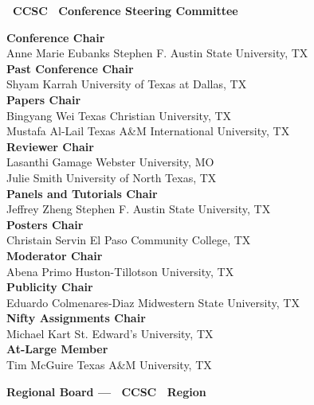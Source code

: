 \documentclass{article}
\begin{document}
\begingroup
  \centering
  \textbf{\large \confYear\ CCSC \confName\ Conference Steering Committee}\\
\endgroup

\vspace{10pt}

{\parindent0pt
\textbf{Conference Chair}\\
Anne Marie Eubanks \dotfill  Stephen F. Austin State University, TX\\
\textbf{Past Conference Chair}\\
Shyam Karrah \dotfill  University of Texas at Dallas, TX\\
\textbf{Papers Chair}\\
Bingyang Wei \dotfill Texas Christian University, TX\\
Mustafa Al-Lail \dotfill Texas A\&M International University, TX\\
\textbf{Reviewer Chair}\\
Lasanthi Gamage \dotfill Webster University, MO\\
Julie Smith \dotfill University of North Texas, TX\\
\textbf{Panels and Tutorials Chair}\\
Jeffrey Zheng \dotfill Stephen F. Austin State University, TX\\
\textbf{Posters Chair}\\
Christain Servin \dotfill El Paso Community College, TX\\
\textbf{Moderator Chair}\\
Abena Primo \dotfill Huston-Tillotson University, TX\\
\textbf{Publicity Chair}\\
Eduardo Colmenares-Diaz \dotfill Midwestern State University, TX\\
\textbf{Nifty Assignments Chair}\\
Michael Kart \dotfill St. Edward's University, TX\\
\textbf{At-Large Member}\\
Tim McGuire \dotfill Texas A\&M University, TX\\
}

\vspace{10pt}
\vspace{10pt}

\begingroup
  \centering
  \textbf{\large Regional Board --- \confYear\ CCSC \confName\ Region}\\
\endgroup

\vspace{10pt}
\end{document}
